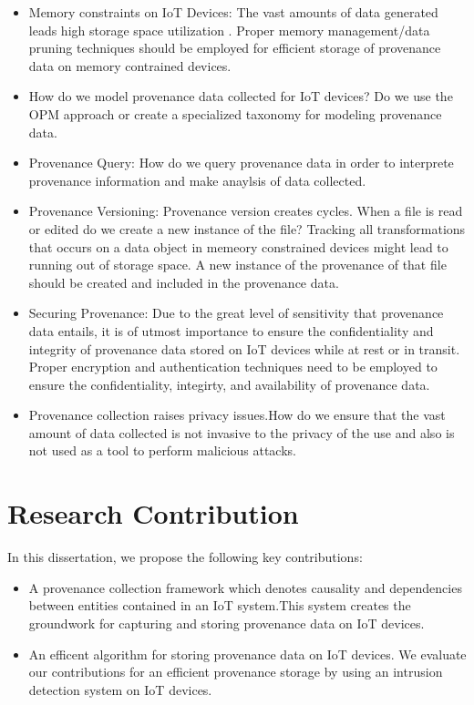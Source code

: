 \begin{itemize}

\item Memory constraints on IoT Devices: The vast amounts of data generated leads high storage space utilization . Proper memory management/data pruning techniques should be employed for efficient storage of provenance data on memory contrained devices. 

\item How do we model provenance data collected for IoT devices? Do we use the OPM approach or create a specialized taxonomy for modeling provenance data.

\item Provenance Query: How do we query provenance data in order to interprete provenance information and make anaylsis of data collected.

\item Provenance Versioning: Provenance version creates cycles. When a file is read or edited do we create a new instance of the file? Tracking all transformations that occurs on a data object in memeory constrained devices might lead to running out of storage space. A new instance of the provenance of that file should be created and included in the provenance data.

\item Securing Provenance: Due to the great level of sensitivity that  provenance data entails, it is of utmost importance to ensure the confidentiality and integrity of provenance data stored on IoT devices while at rest or in transit. Proper encryption and authentication techniques need to be employed to ensure the confidentiality, integirty, and availability of provenance data.

\item Provenance collection raises privacy issues.How do we ensure that the vast amount of data collected is not invasive to the privacy of the use and also is not used as a tool to perform malicious attacks.
\end{itemize}

\section{Research Contribution}

In this dissertation, we propose the following key contributions:

\begin{itemize}
  \item A provenance collection framework which denotes causality and dependencies between entities contained in an IoT system.This system creates the groundwork for capturing and storing provenance data  on IoT devices.
  \item An efficent algorithm for storing provenance data on IoT devices. We evaluate our contributions for an efficient provenance storage by using an intrusion detection system on IoT devices.
\end{itemize}

